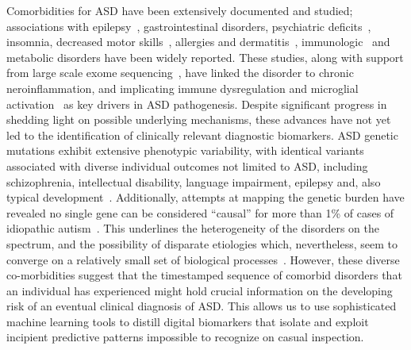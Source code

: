 \documentclass[onecolumn,,10pt]{IEEEtran}
\begin{document}
Comorbidities for ASD have been extensively documented and studied\cite{pmid22511918,pmid30733689,pmid25681541}; associations with epilepsy~\cite{pmid23935565}, gastrointestinal disorders\cite{pmid30646068,pmid21651783,pmid30823414,pmid21282636,pmid29028817,pmid30109601}, psychiatric deficits~\cite{pmid24729779}, insomnia, decreased motor skills~\cite{pmid30337860}, allergies and  dermatitis~\cite{pmid30646068,pmid21651783,pmid30823414,pmid21282636,pmid29028817,pmid30109601}, immunologic~\cite{pmid30971960,pmid30941018,pmid29691724,pmid29307081,pmid27351598,pmid26793298,pmid30095240,pmid25681541} and metabolic\cite{pmid30178105,pmid27957319,pmid29028817} disorders have been widely reported. These studies, along with support from large scale exome sequencing~\cite{Satterstrom484113,pmid25038753}, have linked the disorder to chronic neroinflammation, and implicating immune dysregulation and microglial activation~\cite{pmid15546155,pmid21595886,pmid21629840,pmid26793298,pmid30483058,pmid29691724} as  key drivers in ASD pathogenesis. Despite significant progress in shedding light on possible underlying mechanisms, these advances have not yet led  to the identification of clinically relevant diagnostic biomarkers.  %
ASD genetic mutations exhibit extensive phenotypic variability, with identical
variants associated with diverse individual outcomes not limited to ASD, including schizophrenia, intellectual disability, language impairment, epilepsy and, also typical development~\cite{pmid23537858}.
Additionally, attempts at mapping the genetic burden have revealed no single
gene can be considered ``causal'' for more than 1\% of cases
of idiopathic autism~\cite{pmid23637569}. This  underlines the heterogeneity of the disorders on the spectrum, and the possibility of disparate etiologies which, nevertheless, seem to  converge on a relatively small set of biological processes~\cite{pmid30941018,pmid23935565}. However, these diverse co-morbidities suggest that  the timestamped sequence of comorbid disorders that an individual has experienced might hold crucial information on the developing risk of an eventual clinical diagnosis of ASD. This allows us to use sophisticated machine learning tools to distill digital biomarkers that isolate and exploit incipient predictive patterns impossible to recognize on casual inspection.
\end{document}
